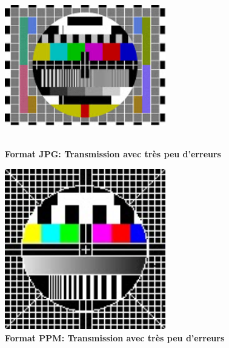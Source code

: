 \begin{figure}[bth]%
\begin{center}
\includegraphics[height=70mm,width=70mm]{jpg_test_bruit65dB}%
\caption{\textbf{Format JPG: Transmission avec très peu d’erreurs}}%
\label{jpg_test_bruit65dB}%
\end {center}
\end{figure}

\begin{figure}[bth]%
\begin{center}
\includegraphics[height=70mm,width=70mm]{BMP_test_bruit64dB}%
\caption{\textbf{Format PPM: Transmission avec très peu d’erreurs}}%
\label{BMP_test_bruit64dB}%
\end {center}
\end{figure}
\paragraph{}


